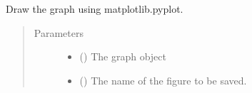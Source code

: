 \documentclass[letterpaper,10pt,english]{sphinxmanual}
\begin{document}
\begin{fulllineitems}
\label{\detokenize{utilities:acat.utilities.draw_graph}}
Draw the graph using matplotlib.pyplot.
\begin{quote}\begin{description}
\item[{Parameters}] \leavevmode\begin{itemize}
\item {} 
 () \textendash{} The graph object

\item {} 
 (\sphinxstyleliteralemphasis{\sphinxupquote{, }}) \textendash{} The name of the figure to be saved.

\end{itemize}

\end{description}\end{quote}

\end{fulllineitems}
\end{document}
